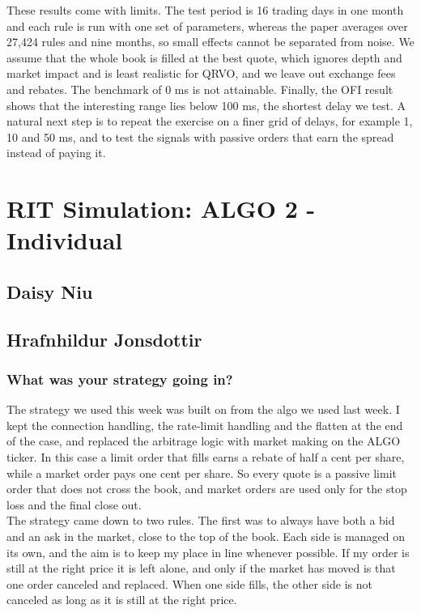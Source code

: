 \documentclass{article}
\begin{document}
\noindent These results come with limits. The test period is 16 trading days in one month and each rule is run with one set of parameters, whereas the paper averages over 27,424 rules and nine months, so small effects cannot be separated from noise. We assume that the whole book is filled at the best quote, which ignores depth and market impact and is least realistic for QRVO, and we leave out exchange fees and rebates. The benchmark of 0 ms is not attainable. Finally, the OFI result shows that the interesting range lies below 100 ms, the shortest delay we test. A natural next step is to repeat the exercise on a finer grid of delays, for example 1, 10 and 50 ms, and to test the signals with passive orders that earn the spread instead of paying it.


\section{RIT Simulation: ALGO 2 - Individual}

\subsection{Daisy Niu}


\subsection{Hrafnhildur Jonsdottir}

\subsubsection{What was your strategy going in?}

The strategy we used this week was built on from the algo we used last week. I kept the connection handling, the rate-limit handling and the flatten at the end of the case, and replaced the arbitrage logic with market making on the ALGO ticker. In this case a limit order that fills earns a rebate of half a cent per share, while a market order pays one cent per share. So every quote is a passive limit order that does not cross the book, and market orders are used only for the stop loss and the final close out.\\

\noindent The strategy came down to two rules. The first was to always have both a bid and an ask in the market, close to the top of the book. Each side is managed on its own, and the aim is to keep my place in line whenever possible. If my order is still at the right price it is left alone, and only if the market has moved is that one order canceled and replaced. When one side fills, the other side is not canceled as long as it is still at the right price.\\
\end{document}

